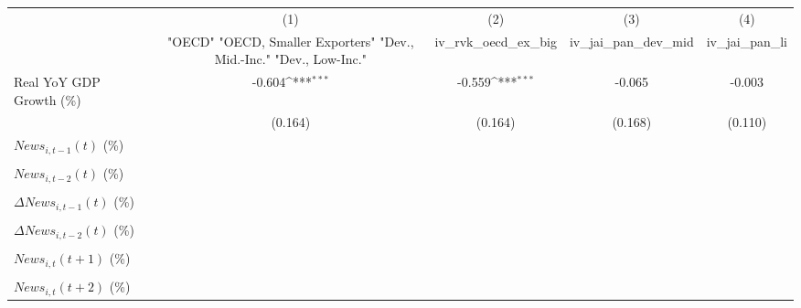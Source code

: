 {
\def\sym#1{\ifmmode^{#1}\else\(^{#1}\)\fi}
\begin{tabular}{l*{4}{c}}
\toprule
                    &\multicolumn{1}{c}{(1)}&\multicolumn{1}{c}{(2)}&\multicolumn{1}{c}{(3)}&\multicolumn{1}{c}{(4)}\\
                    &\multicolumn{1}{c}{ "OECD" "OECD, Smaller Exporters" "Dev., Mid.-Inc." "Dev., Low-Inc."}&\multicolumn{1}{c}{iv_rvk_oecd_ex_big}&\multicolumn{1}{c}{iv_jai_pan_dev_mid}&\multicolumn{1}{c}{iv_jai_pan_li}\\
\midrule
Real YoY GDP Growth (\%)&      -0.604\sym{***}&      -0.559\sym{***}&      -0.065         &      -0.003         \\
                    &     (0.164)         &     (0.164)         &     (0.168)         &     (0.110)         \\
\addlinespace
$ News_{i,t-1}(t)$ (\%)&                     &                     &                     &                     \\
                    &                     &                     &                     &                     \\
\addlinespace
$ News_{i,t-2}(t)$ (\%)&                     &                     &                     &                     \\
                    &                     &                     &                     &                     \\
\addlinespace
$ \Delta News_{i,t-1}(t)$ (\%)&                     &                     &                     &                     \\
                    &                     &                     &                     &                     \\
\addlinespace
$ \Delta News_{i,t-2}(t)$ (\%)&                     &                     &                     &                     \\
                    &                     &                     &                     &                     \\
\addlinespace
$ News_{i,t}(t+1)$ (\%)&                     &                     &                     &                     \\
                    &                     &                     &                     &                     \\
\addlinespace
$ News_{i,t}(t+2)$ (\%)&                     &                     &                     &                     \\

\end{tabular}}
